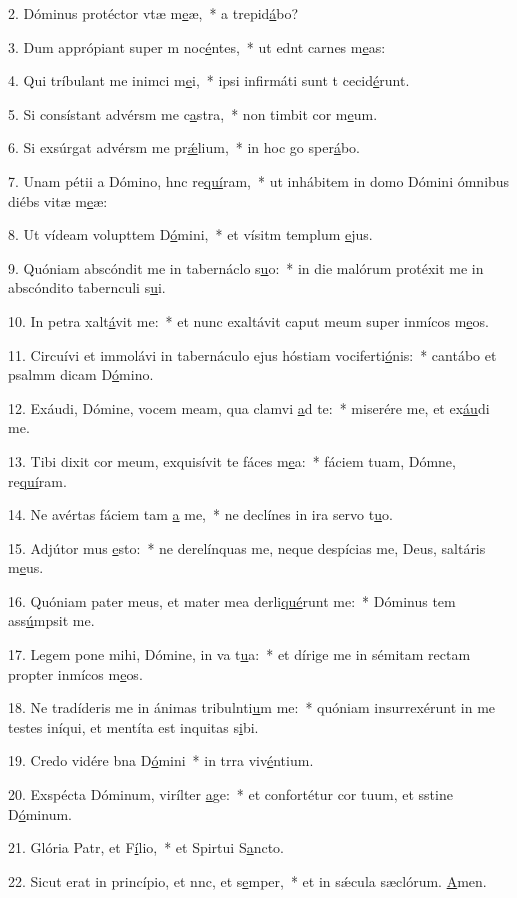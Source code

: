 2. Dóminus protéctor vtæ m\uline{e}æ,~* a  trepid\uline{á}bo?\par 
3. Dum apprópiant super m noc\uline{é}ntes,~* ut ednt carnes m\uline{e}as:\par 
4. Qui tríbulant me inimci m\uline{e}i,~* ipsi infirmáti sunt t cecid\uline{é}runt.\par 
5. Si consístant advérsm me c\uline{a}stra,~* non timbit cor m\uline{e}um.\par 
6. Si exsúrgat advérsm me pr\uline{ǽ}lium,~* in hoc go sper\uline{á}bo.\par 
7. Unam pétii a Dómino, hnc re\uline{quí}ram,~* ut inhábitem in domo Dómini ómnibus diébs vitæ m\uline{e}æ:\par 
8. Ut vídeam volupttem D\uline{ó}mini,~* et vísitm templum \uline{e}jus.\par 
9. Quóniam abscóndit me in tabernáclo s\uline{u}o:~* in die malórum protéxit me in abscóndito tabernculi s\uline{u}i.\par 
10. In petra xalt\uline{á}vit me:~* et nunc exaltávit caput meum super inmícos m\uline{e}os.\par 
11. Circuívi et immolávi in tabernáculo ejus hóstiam vociferti\uline{ó}nis:~* cantábo et psalmm dicam D\uline{ó}mino.\par 
12. Exáudi, Dómine, vocem meam, qua clamvi \uline{a}d te:~* miserére me, et ex\uline{áu}di me.\par 
13. Tibi dixit cor meum, exquisívit te fáces m\uline{e}a:~* fáciem tuam, Dómne, re\uline{quí}ram.\par 
14. Ne avértas fáciem tam \uline{a} me,~* ne declínes in ira  servo t\uline{u}o.\par 
15. Adjútor mus \uline{e}sto:~* ne derelínquas me, neque despícias me, Deus, saltáris m\uline{e}us.\par 
16. Quóniam pater meus, et mater mea derli\uline{qué}runt me:~* Dóminus tem ass\uline{ú}mpsit me.\par 
17. Legem pone mihi, Dómine, in va t\uline{u}a:~* et dírige me in sémitam rectam propter inmícos m\uline{e}os.\par 
18. Ne tradíderis me in ánimas tribulnti\uline{u}m me:~* quóniam insurrexérunt in me testes iníqui, et mentíta est inquitas s\uline{i}bi.\par 
19. Credo vidére bna D\uline{ó}mini~* in trra viv\uline{é}ntium.\par 
20. Exspécta Dóminum, virílter \uline{a}ge:~* et confortétur cor tuum, et sstine D\uline{ó}minum.\par 
21. Glória Patr, et F\uline{í}lio,~* et Spirtui S\uline{a}ncto.\par 
22. Sicut erat in princípio, et nnc, et s\uline{e}mper,~* et in sǽcula sæclórum. \uline{A}men.\par 
